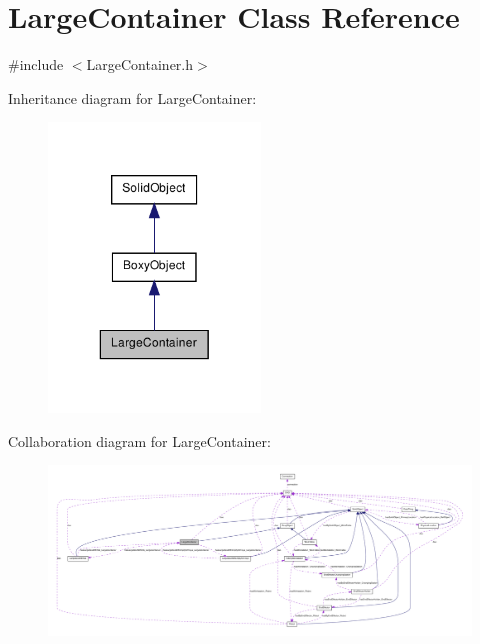 \hypertarget{class_large_container}{
\section{LargeContainer Class Reference}
\label{class_large_container}
}


{\ttfamily \#include $<$LargeContainer.h$>$}



Inheritance diagram for LargeContainer:\nopagebreak
\begin{figure}[H]
\begin{center}
\leavevmode
\includegraphics[width=160pt]{class_large_container__inherit__graph}
\end{center}
\end{figure}


Collaboration diagram for LargeContainer:\nopagebreak
\begin{figure}[H]
\begin{center}
\leavevmode
\includegraphics[width=400pt]{class_large_container__coll__graph}
\end{center}
\end{figure}

